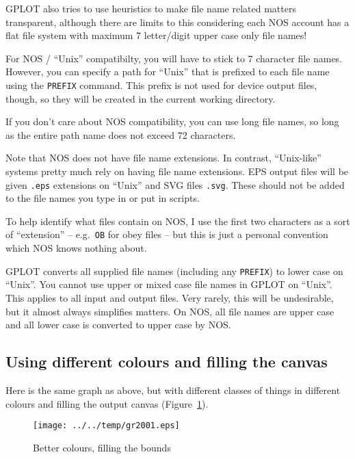 \documentclass[a4paper,twoside,11pt]{article}
\makeatletter
\def\maxwidth{%
  \ifdim\Gin@nat@width>\linewidth
    \linewidth
  \else
    \Gin@nat@width
  \fi
}
\newcommand{\newpara}{\par\vspace{4mm}\noindent}
\makeatother
\begin{document}
\newpara
GPLOT also tries to use heuristics to make file name related matters
transparent, although there are limits to this considering each NOS
account has a flat file system with maximum 7 letter/digit upper case
only file names!

\newpara
For NOS / ``Unix'' compatibilty, you will have to stick to 7 character
file names. However, you can specify a path for ``Unix'' that is
prefixed to each file name using the \texttt{PREFIX} command. This
prefix is not used for device output files, though, so they will be
created in the current working directory.

\newpara
If you don't care about NOS compatibility, you can use long file names,
so long as the entire path name does not exceed 72 characters.

\newpara
Note that NOS does not have file name extensions. In contrast,
``Unix-like'' systems pretty much rely on having file name extensions.
EPS output files will be given \texttt{.eps} extensions on ``Unix'' and
SVG files \texttt{.svg}. These should not be added to the file names you
type in or put in scripts.

\newpara
To help identify what files contain on NOS, I use the first two
characters as a sort of ``extension'' -- e.g.~\texttt{OB} for obey files
-- but this is just a personal convention which NOS knows nothing about.

\newpara
GPLOT converts all supplied file names (including any \texttt{PREFIX})
to lower case on ``Unix''. You cannot use upper or mixed case file names
in GPLOT on ``Unix''. This applies to all input and output files. Very
rarely, this will be undesirable, but it almost always simplifies
matters. On NOS, all file names are upper case and all lower case is
converted to upper case by NOS.

\subsection{Using different colours and filling the canvas}\label{using-different-colours-and-filling-the-canvas}
\newpara
Here is the same graph as above, but with different classes of things in
different colours and filling the output canvas (Figure~\ref{fig:gr2001}).

\begin{figure}
  \centering
  \texttt{[image: ../../temp/gr2001.eps]}
  \caption{Better colours, filling the bounds}
  \label{fig:gr2001}
\end{figure}
\end{document}
